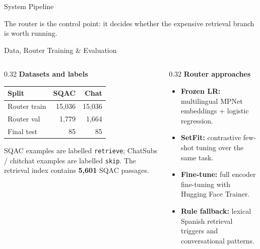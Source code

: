 \documentclass[final]{beamer}
\newcommand{\code}[1]{\texttt{#1}}
\begin{document}
\begin{frame}[t]
\begin{block}{System Pipeline}

  \vspace{0.4em}
  \footnotesize The router is the control point: it decides whether the expensive retrieval branch is worth running.
\end{block}

\begin{block}{Data, Router Training \& Evaluation}
\begin{columns}[T,onlytextwidth]

\begin{column}{0.32\textwidth}
  \textbf{Datasets and labels}\\[0.3em]
  \small
  \begin{tabular}{lrr}
    \toprule
    \textbf{Split} & \textbf{SQAC} & \textbf{Chat} \\
    \midrule
    Router train & 15,036 & 15,036 \\
    Router val & 1,779 & 1,664 \\
    Final test & 85 & 85 \\
    \bottomrule
  \end{tabular}

  \vspace{0.4em}
  SQAC examples are labelled \code{retrieve}; ChatSubs / chitchat examples are
  labelled \code{skip}. The retrieval index contains \textbf{5,601} SQAC passages.
\end{column}

\begin{column}{0.32\textwidth}
  \textbf{Router approaches}\\[0.3em]
  \small
  \begin{itemize}\setlength\itemsep{0.18em}
    \item \textbf{Frozen LR:} multilingual MPNet embeddings + logistic regression.
    \item \textbf{SetFit:} contrastive few-shot tuning over the same task.
    \item \textbf{Fine-tune:} full encoder fine-tuning with Hugging Face Trainer.
    \item \textbf{Rule fallback:} lexical Spanish retrieval triggers and conversational patterns.
  \end{itemize}
\end{column}


\end{columns}
\end{block}
\end{frame}
\end{document}
